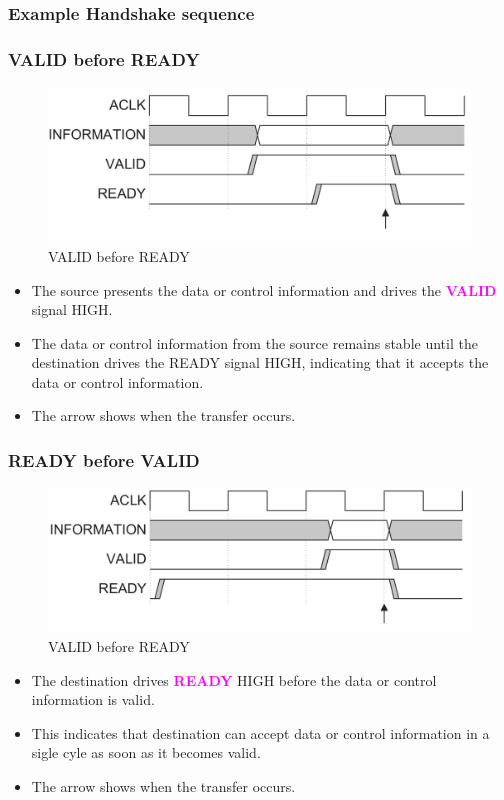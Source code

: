 \documentclass{article}
\newcommand{\AXISignals}[1]{\textbf{\textcolor{magenta}{#1}}}
\begin{document}
\subsubsection{Example Handshake sequence}
\subsubsection*{VALID before READY}
\begin{figure}[H]
    \centering
    \includegraphics[width=1\textwidth]{Resources/ValidBeforeReady.png}
    \caption{VALID before READY}
\end{figure}
\begin{itemize}
    \item The source presents the data or control information and drives the \AXISignals{VALID} signal HIGH.
    \item The data or control information from the source remains stable until the destination drives the READY signal HIGH, indicating that it accepts the data or control information.
    \item The arrow shows when the transfer occurs.
\end{itemize}

\subsubsection*{READY before VALID}
\begin{figure}[H]
    \centering
    \includegraphics[width=1\textwidth]{Resources/ReadyBeforeValid.png}
    \caption{VALID before READY}
\end{figure}
\begin{itemize}
    \item The destination drives \AXISignals{READY} HIGH before the data or control information is valid.
    \item This indicates that destination can accept data or control information in a sigle cyle as soon as it becomes valid.
    \item The arrow shows when the transfer occurs.
\end{itemize}
\end{document}
